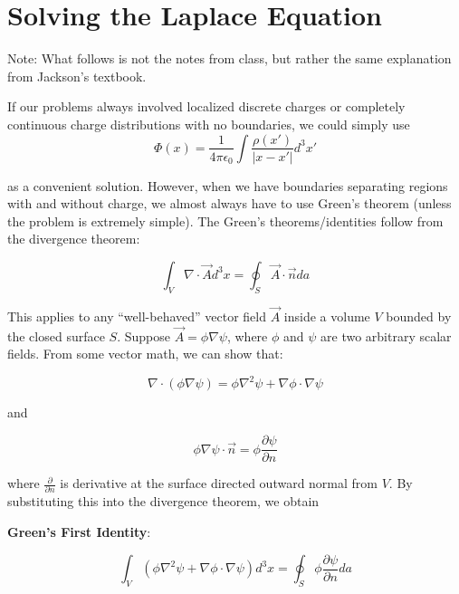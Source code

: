 \documentclass[a4paper,twoside,master.tex]{subfiles}
\begin{document}
\section{Solving the Laplace Equation}%
\label{sec:solving_the_laplace_equation}

\begin{note}{Note:}
    What follows is not the notes from class, but rather the same explanation from Jackson's textbook.
\end{note}

If our problems always involved localized discrete charges or completely continuous charge distributions with no boundaries, we could simply use
\begin{equation}
    \Phi(x) = \frac{1}{4\pi\epsilon_0}\int\frac{\rho(x')}{|x-x'|}d^3x'
\end{equation}

as a convenient solution. However, when we have boundaries separating regions with and without charge, we almost always have to use Green's theorem (unless the problem is extremely simple). The Green's theorems/identities follow from the divergence theorem:

\begin{equation}
    \int_V\nabla\cdot\vec{A}d^3x = \oint_S\vec{A}\cdot\vec{n} da
\end{equation}

This applies to any ``well-behaved'' vector field $\vec{A}$ inside a volume $V$ bounded by the closed surface $S$. Suppose $\vec{A} = \phi\nabla\psi$, where $\phi$ and $\psi$ are two arbitrary scalar fields. From some vector math, we can show that:

\begin{equation}
    \nabla\cdot(\phi\nabla\psi) = \phi\nabla^2\psi + \nabla\phi\cdot\nabla\psi
\end{equation}

and

\begin{equation}
    \phi\nabla\psi\cdot\vec{n} = \phi\frac{\partial\psi}{\partial n}
\end{equation}

where $\frac{\partial}{\partial n}$ is derivative at the surface directed outward normal from $V$. By substituting this into the divergence theorem, we obtain
\begin{definition}
    \textbf{Green's First Identity}:

    \begin{equation}
        \int_V (\phi\nabla^2\psi + \nabla\phi\cdot\nabla\psi)d^3x = \oint_S\phi\frac{\partial\psi}{\partial n}da
    \end{equation}

\end{definition}
\end{document}
